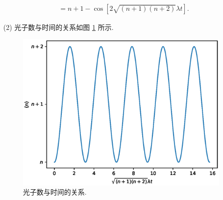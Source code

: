 \documentclass{assignment}
\begin{document}
\begin{sol}
\begin{itemize}
\begin{align}
            &=n+1-\cos[2\sqrt{(n+1)(n+2)}\lambda t].
        \end{align}
        \item[(2)] 光子数与时间的关系如图 \ref{2014-7} 所示.
        \begin{figure}[H]
            \centering
            \includegraphics[width=.5\columnwidth]{Figures/2014-7.eps}
            \caption{光子数与时间的关系.}
            \label{2014-7}
        \end{figure}
    \end{itemize}
\end{sol}
\end{document}
